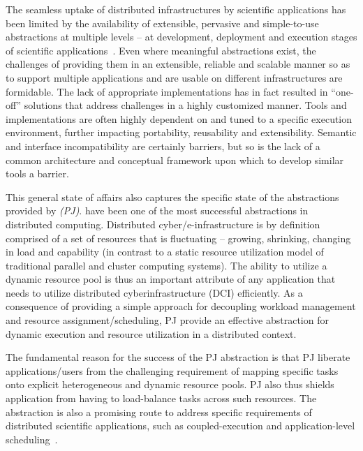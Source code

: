 \documentclass{sig-alternate}
\begin{document}
The seamless uptake of distributed infrastructures by scientific
applications has been limited by the availability of extensible,
pervasive and simple-to-use abstractions at multiple levels -- at
development, deployment and execution stages of scientific
applications~\cite{dpagrid2009}.  Even where meaningful abstractions
exist, the challenges of providing them in an extensible, reliable and
scalable manner so as to support multiple applications and are
usable on different infrastructures are formidable.  The lack of
appropriate implementations has in fact resulted in ``one-off''
solutions that address challenges in a highly customized manner.
Tools and implementations are often highly dependent on and tuned to a
specific execution environment, further impacting portability,
reusability and extensibility.  Semantic and interface incompatibility
are certainly barriers, but so is the lack of a common architecture
and conceptual framework upon which to develop similar tools a
barrier.


This general state of affairs also captures the specific state of the
abstractions provided by {\it \pilotjobs (PJ)}. \pilotjobs have been
one of the most successful abstractions in distributed
computing. Distributed cyber/e-infrastructure is by definition
comprised of a set of resources that is fluctuating -- growing,
shrinking, changing in load and capability (in contrast to a static
resource utilization model of traditional parallel
and cluster computing systems).  The ability to utilize a dynamic resource
pool is thus an important attribute of any application that needs to
utilize distributed cyberinfrastructure (DCI) efficiently. As a
consequence of providing a simple approach for decoupling workload
management and resource assignment/scheduling, PJ provide an
effective abstraction for dynamic execution and resource utilization in
a distributed context.


The fundamental reason for the success of the PJ abstraction is that
PJ liberate applications/users from the challenging requirement of
mapping specific tasks onto explicit heterogeneous and dynamic
resource pools.  PJ also thus shields application from having to
load-balance tasks across such resources.  The \pilotjob abstraction
is also a promising route to address specific requirements of
distributed scientific applications, such as coupled-execution and
application-level scheduling~\cite{ko-efficient,DBLP:conf/hpdc/KimHMAJ10}.
\end{document}

